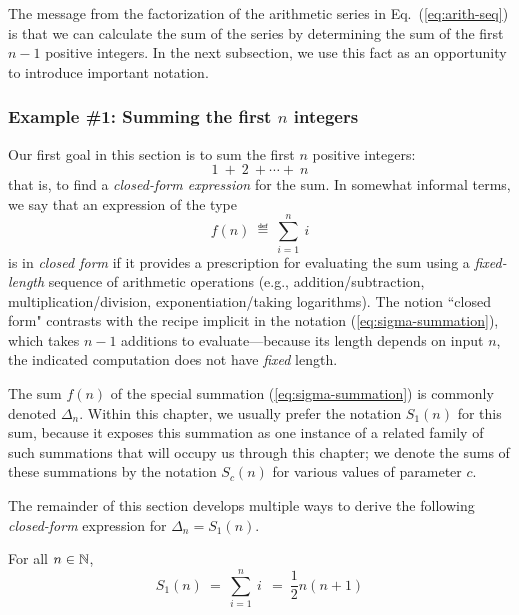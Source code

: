 The message from the factorization of the arithmetic series in Eq.~(\ref{eq:arith-seq}) is that we can calculate the sum of the series by determining the sum of the first $n-1$ positive integers.  In the next subsection, we use this fact as an opportunity to introduce important notation.

\subsubsection{Example \#1: Summing the first $n$ integers}
\label{sec:special-arithmetic-sums}

Our first goal in this section is to sum the first $n$ positive integers:
\[ 1 \ + \ 2 \ + \cdots + \ n \]
that is, to find a {\it closed-form expression} for the sum.  In somewhat informal terms, we say that an expression of the type
\begin{equation}
\label{eq:sigma-summation}
f(n) \ \eqdef \ \sum_{i=1}^n \ i
\end{equation}
is in {\it closed form} if it provides a prescription for evaluating the sum using a {\em fixed-length} sequence of arithmetic operations (e.g., addition/subtraction, multiplication/division, exponentiation/taking logarithms).  The notion ``closed form" contrasts with the recipe implicit in the notation (\ref{eq:sigma-summation}), which takes $n-1$ additions to evaluate---because its length depends on input $n$, the indicated computation does not have {\em fixed} length. 

The sum $f(n)$ of the special summation  (\ref{eq:sigma-summation}) is commonly denoted $\Delta_n$.  Within this chapter, we usually prefer the notation $S_1(n)$ for this sum, because it
exposes this summation as one instance of a related family of such summations that will occupy us through this chapter; we denote the sums of these summations by the notation $S_c(n)$ for various values of parameter $c$.

\smallskip

The remainder of this section develops multiple ways to derive the following {\em closed-form} expression for $\Delta_n = S_1(n)$.

\begin{prop}
\label{thm:sum-first-integers-Gauss}
For all $n \in \mathbb{N}$,
\begin{equation}
\label{eq:sum-1-to-n}
S_1(n) \ = \ \sum_{i=1}^n \ i \  \ = \  \frac{1}{2} n (n+1) 
\end{equation}
\end{prop}

